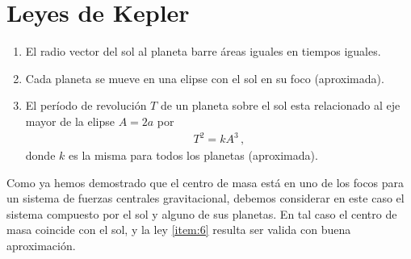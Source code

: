 


\section{Leyes de Kepler}

\begin{frame}
\begin{enumerate}
\item El radio vector del sol al planeta barre áreas iguales en tiempos iguales.
\item Cada planeta se mueve en una elipse con el sol en su foco (aproximada).
\label{item:6}
\item El período de revolución $T$ de un planeta sobre el sol esta relacionado al eje mayor de la elipse $A=2a$ por
  \begin{align}
    T^2=k A^3\,,
  \end{align}
donde $k$ es la misma para todos los planetas (aproximada).
\label{item:7}
\end{enumerate}
\end{frame}

Como ya hemos demostrado que el centro de masa está en uno de los focos para un sistema de fuerzas centrales gravitacional, debemos considerar en este caso el sistema compuesto por el sol y alguno de sus planetas. En tal caso el centro de masa coincide con el sol, y la ley \ref{item:6} resulta ser valida con buena aproximación. 

